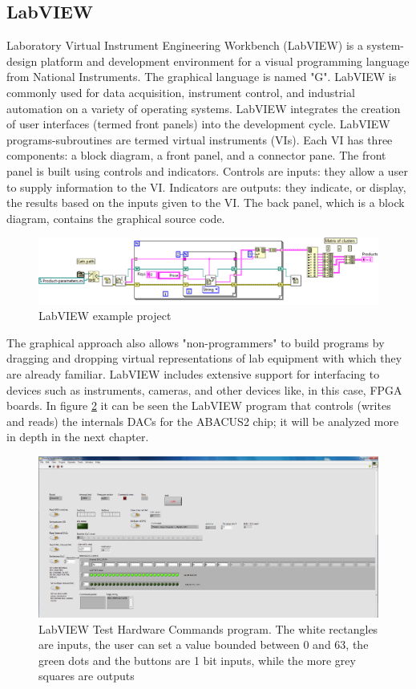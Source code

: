\subsection{LabVIEW}
\noindent Laboratory Virtual Instrument Engineering Workbench (LabVIEW) is a system-design platform and development environment for a visual programming language from National Instruments. The graphical language is named "G". LabVIEW is commonly used for data acquisition, instrument control, and industrial automation on a variety of operating systems.
LabVIEW integrates the creation of user interfaces (termed front panels) into the development cycle. LabVIEW programs-subroutines are termed virtual instruments (VIs). Each VI has three components: a block diagram, a front panel, and a connector pane.
The front panel is built using controls and indicators. Controls are inputs: they allow a user to supply information to the VI. Indicators are outputs: they indicate, or display, the results based on the inputs given to the VI. The back panel, which is a block diagram, contains the graphical source code.
\begin{figure}[H]
	\centering
	\includegraphics[width=0.9\linewidth]{IMG/ch3/LABVIEW}
	\caption{LabVIEW example project}
	\label{fig:labview}
\end{figure}
\noindent The graphical approach also allows "non-programmers" to build programs by dragging and dropping virtual representations of lab equipment with which they are already familiar.
\newline
LabVIEW includes extensive support for interfacing to devices such as instruments, cameras, and other devices like, in this case, FPGA boards.
\newline
In figure \ref{fig:labview2} it can be seen the LabVIEW program that controls (writes and reads) the internals DACs for the ABACUS2 chip; it will be analyzed more in depth in the next chapter.
\begin{figure}[H]
	\centering
	\includegraphics[width=0.9\linewidth]{IMG/ch3/LABVIEW2}
	\caption{LabVIEW Test Hardware Commands program. The white rectangles are inputs, the user can set a value bounded between 0 and 63, the green dots and the buttons are 1 bit inputs, while the more grey squares are outputs}
	\label{fig:labview2}
\end{figure}
